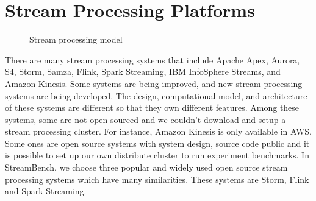 
\chapter{Stream Processing Platforms}

\begin{figure}
  \begin{center}
   \caption{Stream processing model}
   \label{fig:stream_process_model}
  \end{center}
\end{figure}

There are many stream processing systems that include Apache Apex, Aurora, S4, Storm, Samza, Flink, Spark Streaming, IBM InfoSphere Streams, and Amazon Kinesis. Some systems are being improved, and new stream processing systems are being developed. The design, computational model, and architecture of these systems are different so that they own different features. Among these systems, some are not open sourced and we couldn't download and setup a stream processing cluster. For instance, Amazon Kinesis is only available in AWS. Some ones are open source systems with system design, source code public and it is possible to set up our own distribute cluster to run experiment benchmarks. In StreamBench, we choose three popular and widely used open source stream processing systems which have many similarities. These systems are Storm, Flink and Spark Streaming. 


